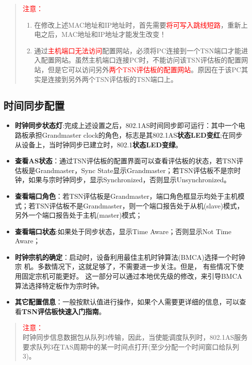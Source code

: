 \begin{quote}
\kaishu
\textcolor{red}{注意：} 
\begin{enumerate}
\item 在修改上述MAC地址和IP地址时，首先需要\textcolor{red}{将可写入跳线短路}，重新上电之后，MAC地址和IP地址才能发生改变！
\item 通过\textcolor{red}{主机端口无法访问}配置网站，必须将PC连接到一个TSN端口才能进入配置网站。虽然主机端口连接PC时，不能访问该TSN评估板的配置网站，但是它可以访问另外\textcolor{red}{两个TSN评估板的配置网站}。原因在于该PC其实是连接到另外两个TSN评估板的TSN端口上。
\end{enumerate}
\end{quote}

\subsection{时间同步配置}

\begin{itemize}
	\item \textbf{时钟同步状态灯}:完成上述设置之后，802.1AS时间同步即可运行：其中一个电路板承担Grandmaster clock的角色，标志是其802.1AS\textbf{状态LED变红};在同步从设备上，当时钟同步已建立时，802.1\textbf{状态LED变绿}。
	\item \textbf{查看AS状态}：通过TSN评估板的配置界面可以查看评估板的状态，若TSN评估板是Grandmaster，Sync State显示Grandmaster；若TSN评估板不是宗时钟，如果与宗时钟同步，显示Synchronized，否则显示Unsynchronized。
	\item \textbf{查看端口角色}：若TSN评估板是Grandmaster，端口角色框显示均处于主机模式；若TSN评估板不是Grandmaster，则一个端口报告处于从机(slave)模式，另外一个端口报告处于主机(master)模式；
	\item \textbf{查看端口状态}:如果处于同步状态，显示Time Aware；否则显示Not Time Aware；
	\item \textbf{时钟宗机的确定}：启动时，设备利用最佳主机时钟算法(BMCA)选择一个时钟宗 机。多数情况下，这就足够了，不需要进一步关注。但是， 有些情况下使用固定宗机可能更好。 这一部分可以通过本地优先级的修改，来引导BMCA算法选择特定板作为宗时钟。
	\item \textbf{其它配置信息}：一般按默认值进行操作，如果个人需要更详细的信息，可以查看\textbf{TSN评估板快速入门指南}。
\end{itemize}

\begin{quote}
	\textcolor{red}{注意：}\\
	时钟同步信息数据包从队列3传输，因此，当使能调度队列时，802.1AS服务要求队列3在TAS周期中的某一时间点打开(至少分配一个时间窗口给队列3)。
\end{quote}

